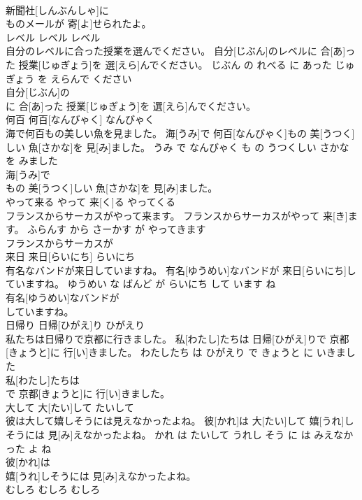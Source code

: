 \documentclass[8pt]{extreport}
\begin{document}
\begin{CJK}{UTF8}{min}
\\	新聞社[しんぶんしゃ]に
\\	ものメールが 寄[よ]せられたよ。			
\\	レベル	レベル	レベル	
\\	自分のレベルに合った授業を選んでください。	自分[じぶん]のレベルに 合[あ]った 授業[じゅぎょう]を 選[えら]んでください。	じぶん の れべる に あった じゅぎょう を えらんで ください	
\\	自分[じぶん]の
\\	に 合[あ]った 授業[じゅぎょう]を 選[えら]んでください。			
\\	何百	何百[なんびゃく]	なんびゃく	
\\	海で何百もの美しい魚を見ました。	海[うみ]で 何百[なんびゃく]もの 美[うつく]しい 魚[さかな]を 見[み]ました。	うみ で なんびゃく も の うつくしい さかな を みました	
\\	海[うみ]で
\\	もの 美[うつく]しい 魚[さかな]を 見[み]ました。			
\\	やって来る	やって 来[く]る	やってくる	
\\	フランスからサーカスがやって来ます。	フランスからサーカスがやって 来[き]ます。	ふらんす から さーかす が やってきます	
\\	フランスからサーカスが
\\	来日	来日[らいにち]	らいにち	
\\	有名なバンドが来日していますね。	有名[ゆうめい]なバンドが 来日[らいにち]していますね。	ゆうめい な ばんど が らいにち して います ね	
\\	有名[ゆうめい]なバンドが
\\	していますね。			
\\	日帰り	日帰[ひがえ]り	ひがえり	
\\	私たちは日帰りで京都に行きました。	私[わたし]たちは 日帰[ひがえ]りで 京都[きょうと]に 行[い]きました。	わたしたち は ひがえり で きょうと に いきました	
\\	私[わたし]たちは
\\	で 京都[きょうと]に 行[い]きました。			
\\	大して	大[たい]して	たいして	
\\	彼は大して嬉しそうには見えなかったよね。	彼[かれ]は 大[たい]して 嬉[うれ]しそうには 見[み]えなかったよね。	かれ は たいして うれし そう に は みえなかった よ ね	
\\	彼[かれ]は
\\	嬉[うれ]しそうには 見[み]えなかったよね。			
\\	むしろ	むしろ	むしろ	

\end{CJK}
\end{document}
